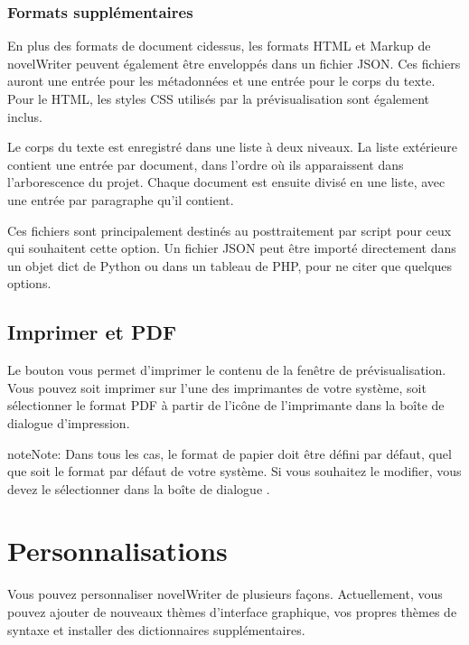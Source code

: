 \documentclass[a4paper,11pt,french]{sphinxmanual}
\begin{document}
\subsection{Formats supplémentaires}
\label{\detokenize{project_manuscript:additional-formats}}
\sphinxAtStartPar
En plus des formats de document ci\sphinxhyphen{}dessus, les formats HTML et Markup de novelWriter peuvent également être enveloppés dans un fichier JSON. Ces fichiers auront une entrée pour les métadonnées et une entrée pour le corps du texte. Pour le HTML, les styles CSS utilisés par la prévisualisation sont également inclus.

\sphinxAtStartPar
Le corps du texte est enregistré dans une liste à deux niveaux. La liste extérieure contient une entrée par document, dans l’ordre où ils apparaissent dans l’arborescence du projet. Chaque document est ensuite divisé en une liste, avec une entrée par paragraphe qu’il contient.

\sphinxAtStartPar
Ces fichiers sont principalement destinés au post\sphinxhyphen{}traitement par script pour ceux qui souhaitent cette option. Un fichier JSON peut être importé directement dans un objet dict de Python ou dans un tableau de PHP, pour ne citer que quelques options.


\section{Imprimer et PDF}
\label{\detokenize{project_manuscript:print-and-pdf}}\label{\detokenize{project_manuscript:a-manuscript-print}}
\sphinxAtStartPar
Le bouton  vous permet d’imprimer le contenu de la fenêtre de prévisualisation. Vous pouvez soit imprimer sur l’une des imprimantes de votre système, soit sélectionner le format PDF à partir de l’icône de l’imprimante dans la boîte de dialogue d’impression.

\begin{sphinxadmonition}{note}{Note:}
\sphinxAtStartPar
Dans tous les cas, le format de papier doit être défini par défaut, quel que soit le format par défaut de votre système. Si vous souhaitez le modifier, vous devez le sélectionner dans la boîte de dialogue .
\end{sphinxadmonition}

\sphinxstepscope


\chapter{Personnalisations}
\label{\detokenize{more_customise:customisations}}\label{\detokenize{more_customise:a-custom}}\label{\detokenize{more_customise::doc}}
\sphinxAtStartPar
Vous pouvez personnaliser novelWriter de plusieurs façons. Actuellement, vous pouvez ajouter de nouveaux thèmes d’interface graphique, vos propres thèmes de syntaxe et installer des dictionnaires supplémentaires.
\end{document}
